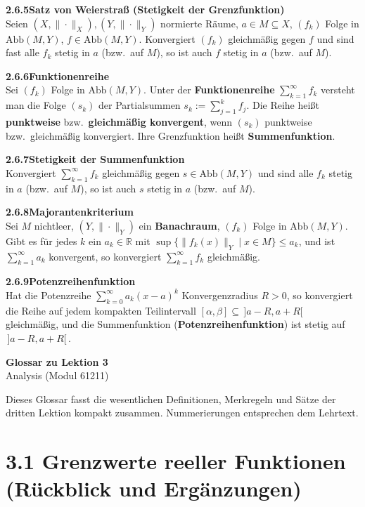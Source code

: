 \documentclass[a4paper,12pt]{article}
\newcommand{\gentry}[3]{%
  \noindent\textbf{#1\quad #2}\nopagebreak\\[0.2em]
  #3\par\smallskip
}
\begin{document}
\gentry{2.6.5}{Satz von Weierstraß (Stetigkeit der Grenzfunktion)}{%
  Seien $(X, \|\cdot\|_X), (Y, \|\cdot\|_Y)$ normierte Räume, $a \in M \subseteq X$,
  $(f_k)$ Folge in $\mathrm{Abb}(M, Y)$, $f \in \mathrm{Abb}(M, Y)$.
  Konvergiert $(f_k)$ gleichmäßig gegen $f$ und sind fast alle $f_k$ stetig in
  $a$ (bzw.\ auf $M$), so ist auch $f$ stetig in $a$ (bzw.\ auf $M$).
}

\gentry{2.6.6}{Funktionenreihe}{%
  Sei $(f_k)$ Folge in $\mathrm{Abb}(M, Y)$. Unter der \textbf{Funktionenreihe}
  $\sum_{k=1}^\infty f_k$ versteht man die Folge $(s_k)$ der Partialsummen
  $s_k := \sum_{j=1}^k f_j$. Die Reihe heißt \textbf{punktweise} bzw.\
  \textbf{gleichmäßig konvergent}, wenn $(s_k)$ punktweise bzw.\ gleichmäßig
  konvergiert. Ihre Grenzfunktion heißt \textbf{Summenfunktion}.
}

\gentry{2.6.7}{Stetigkeit der Summenfunktion}{%
  Konvergiert $\sum_{k=1}^\infty f_k$ gleichmäßig gegen $s \in \mathrm{Abb}(M, Y)$
  und sind alle $f_k$ stetig in $a$ (bzw.\ auf $M$), so ist auch $s$ stetig in $a$
  (bzw.\ auf $M$).
}

\gentry{2.6.8}{Majorantenkriterium}{%
  Sei $M$ nichtleer, $(Y, \|\cdot\|_Y)$ ein \textbf{Banachraum}, $(f_k)$ Folge in
  $\mathrm{Abb}(M, Y)$. Gibt es für jedes $k$ ein $a_k \in \mathbb{R}$ mit
  $\sup\{\|f_k(x)\|_Y \mid x \in M\} \leq a_k$, und ist $\sum_{k=1}^\infty a_k$
  konvergent, so konvergiert $\sum_{k=1}^\infty f_k$ gleichmäßig.
}

\gentry{2.6.9}{Potenzreihenfunktion}{%
  Hat die Potenzreihe $\sum_{k=0}^\infty a_k(x - a)^k$ Konvergenzradius $R > 0$,
  so konvergiert die Reihe auf jedem kompakten Teilintervall
  $[\alpha, \beta] \subseteq \,]a - R, a + R[\,$ gleichmäßig, und die
  Summenfunktion (\textbf{Potenzreihenfunktion}) ist stetig auf
  $\,]a - R, a + R[\,$.
}

\newpage

\begin{center}
  {\LARGE\bfseries Glossar zu Lektion 3}\\[0.5em]
  {\large Analysis (Modul 61211)}
\end{center}

\vspace{1em}

Dieses Glossar fasst die wesentlichen Definitionen, Merkregeln und S\"atze
der dritten Lektion kompakt zusammen. Nummerierungen entsprechen dem Lehrtext.

\section*{3.1 \quad Grenzwerte reeller Funktionen (R\"uckblick und Erg\"anzungen)}
\end{document}
